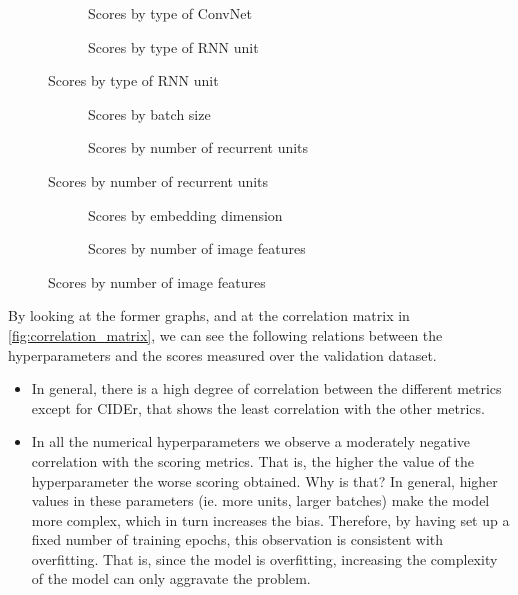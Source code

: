 \begin{figure}
  \begin{subfigure}[b]{0.5\textwidth}
    
    \caption{Scores by type of ConvNet}
    \label{fig:scores_by_cnn}
  \end{subfigure}
  \begin{subfigure}[b]{0.5\textwidth}
    
    \caption{Scores by type of RNN unit}
    \label{fig:scores_by_rnn}
  \end{subfigure}
\end{figure}

\begin{figure}
  \begin{subfigure}[b]{0.5\textwidth}
    
    \caption{Scores by batch size}
    \label{fig:scores_by_batch_size}
  \end{subfigure}
  \begin{subfigure}[b]{0.5\textwidth}
    
    \caption{Scores by number of recurrent units}
    \label{fig:scores_by_hidden_units}
  \end{subfigure}
\end{figure}

\begin{figure}
  \begin{subfigure}[b]{0.5\textwidth}
    
    \caption{Scores by embedding dimension}
    \label{fig:scores_by_embedding}
  \end{subfigure}
  \begin{subfigure}[b]{0.5\textwidth}
    
    \caption{Scores by number of image features}
    \label{fig:scores_by_features}
  \end{subfigure}
\end{figure}

By looking at the former graphs, and at the correlation matrix in \cref{fig:correlation_matrix}, we can see the following relations between the hyperparameters and the scores measured over the validation dataset.
\begin{itemize}
    \item In general, there is a high degree of correlation between the different metrics except for CIDEr, that shows the least correlation with the other metrics.
    \item In all the numerical hyperparameters we observe a moderately negative correlation with the scoring metrics. That is, the higher the value of the hyperparameter the worse scoring obtained. Why is that? In general, higher values in these parameters  (ie. more units, larger batches) make the model more complex, which in turn increases the bias. Therefore, by having set up a fixed number of training epochs, this observation is consistent with overfitting. That is, since the model is overfitting, increasing the complexity of the model can only aggravate the problem. 
\end{itemize}


